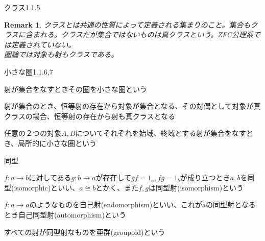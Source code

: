 \documentclass[unicode,12pt,aspectratio=169]{beamer}
\newtheorem*{remark}{Remark}
\begin{document}
\begin{frame}{クラス1.1.5}
    \begin{tcolorbox}
        \begin{remark}
            クラスとは共通の性質によって定義される集まりのこと。集合もクラスに含まれる。クラスだが集合ではないものは真クラスという。ZFC公理系では定義されていない。\\
            圏論では対象も射もクラスである。
        \end{remark}
    \end{tcolorbox}
\end{frame}
\begin{frame}{小さな圏1.1.6,7}
    \begin{tcolorbox}
        \begin{definition}
            射が集合をなすときその圏を小さな圏という
        \end{definition}
        \begin{theorem}
            射が集合のとき、恒等射の存在から対象が集合となる、その対偶として対象が真クラスの場合、恒等射の存在から射も真クラスとなる
        \end{theorem}
        \begin{definition}
            任意の２つの対象$A,B$についてそれぞれを始域、終域とする射が集合をなすとき、局所的に小さな圏という
        \end{definition}
    \end{tcolorbox}
\end{frame}
\begin{frame}{同型}
    \begin{tcolorbox}
        \begin{definition}
            $f:a \rightarrow b$に対してある$g:b \rightarrow a$が存在して$gf=1_a , fg=1_b$が成り立つとき$a,b$を同型(isomorphic)といい、$a \cong b$とかく、また$f,g$は同型射(isomorphism)という
        \end{definition}
        \begin{definition}
            $f:a \rightarrow a$のようなものを自己射(endomorphism)といい、これがaの同型射となるとき自己同型射(automorphism)という
        \end{definition}
        \begin{definition}
            すべての射が同型射なものを亜群(groupoid)という
        \end{definition}
    \end{tcolorbox}
\end{frame}
\end{document}
